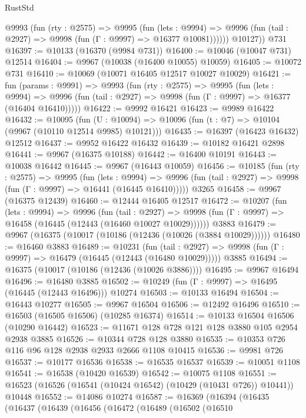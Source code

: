 \begin{lexlean}{RustStd}
\begin{coremodule}
{\begin{coremodule}
{{{{{{{{{{{{{{{{{{{{{{{{{{{{{{{{{{{{{{{{{{{{{{{{{{{{{{{{{{{{{{{{{{{{{{{{{{{{{{          @9993
            (fun (rty : @2575) =>
            @9995
              (fun (lets : @9994) =>
              @9996 (fun (tail : @2927) => @9998 (fun (Γ : @9997) => @16377 @10081))))))
        @10127))
    @731
@16397 := @10133 (@16370 (@9984 @731))
@16400 := @10046 (@10047 @731) @12514
@16404 := @9967 (@10038 (@16400 @10055) @10059)
@16405 := @10072 @731
@16410 := @10069 (@10071 @16405 @12517 @10027 @10029)
@16421 := fun (params : @9991) =>
  @9993
    (fun (rty : @2575) =>
    @9995
      (fun (lets : @9994) =>
      @9996 (fun (tail : @2927) => @9998 (fun (Γ : @9997) => @16377 (@16404 @16410)))))
@16422 := @9992 @16421
@16423 := @9989 @16422
@16432 := @10095
    (fun (U : @10094) => @10096 (fun (t : @7) => @10104 (@9967 (@10110 @12514 @9985) @10121)))
@16435 := @16397 (@16423 @16432) @12512
@16437 := @9952 @16422 @16432
@16439 := @10182 @16421 @2898
@16441 := @9967 (@16375 @10188)
@16442 := @16400 @10191
@16443 := @10038 @16442
@16445 := @9967 (@16443 @10059)
@16456 := @10185
    (fun (rty : @2575) =>
    @9995
      (fun (lets : @9994) =>
      @9996 (fun (tail : @2927) => @9998 (fun (Γ : @9997) => @16441 (@16445 @16410)))))
    @3265
@16458 := @9967 (@16375 @12439)
@16460 := @12444 @16405 @12517
@16472 := @10207
    (fun (lets : @9994) =>
    @9996
      (fun (tail : @2927) =>
      @9998 (fun (Γ : @9997) => @16458 (@16445 (@12443 (@16460 @10027 @10029))))))
    @3883
@16479 := @9967 (@16375 (@10017 (@10186 (@12436 (@10026 (@3884 @10029))))))
@16480 := @16460 @3883
@16489 := @10231
    (fun (tail : @2927) => @9998 (fun (Γ : @9997) => @16479 (@16445 (@12443 (@16480 @10029)))))
    @3885
@16494 := @16375 (@10017 (@10186 (@12436 (@10026 @3886))))
@16495 := @9967 @16494
@16496 := @16480 @3885
@16502 := @10249 (fun (Γ : @9997) => @16495 (@16445 (@12443 @16496))) @10274
@16503 := @10133 @16494
@16504 := @16443 @10277
@16505 := @9967 @16504
@16506 := @12492 @16496
@16510 := @16503 (@16505 @16506) (@10285 @16374)
@16514 := @10133 @16504 @16506 (@10290 @16442)
@16523 := @11671 @128 @728 @121 @128 @3880 @105 @2954 @2938 @3885
@16526 := @10344 @728 @128 @3880
@16535 := @10353 @726 @116 @96 @128 @2938 @2933 @2666 @1108 @10415
@16536 := @9981 @726
@16537 := @10177 @16536
@16538 := @16535 @16537
@16539 := @10051 @1108
@16541 := @16538 (@10420 @16539)
@16542 := @10075 @1108
@16551 := @16523 (@16526 (@16541 (@10424 @16542) (@10429 (@10431 @726)) @10441)) @10448
@16552 := @14086 @10274
@16587 := @16369
    (@16394
      (@16435
        (@16437
          (@16439
            (@16456
              (@16472
                (@16489
                  (@16502
                    (@16510
}}}}}}}}}}}}}}}}}}}}}}}}}}}}}}}}}}}}}}}}}}}}}}}}}}}}}}}}}}}}}}}}}}}}}}}}}}}}}}
\end{coremodule}}
\end{coremodule}
\end{lexlean}
